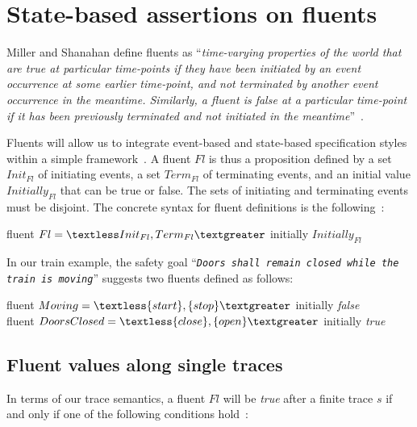 \section{State-based assertions on fluents\label{section:background-fluents}}

Miller and Shanahan define fluents as ``\emph{time-varying properties of the world that are true at particular time-points if they have been initiated by an event occurrence at some earlier time-point, and not terminated by another event occurrence in the meantime. Similarly, a fluent is false at a particular time-point if it has been previously terminated and not initiated in the meantime}''~\cite{Miller:2002}.

Fluents will allow us to integrate event-based and state-based specification styles within a simple framework~\cite{Giannakopoulou:2003}. A fluent $Fl$ is thus a proposition defined by a set $Init_{Fl}$ of initiating events, a set $Term_{Fl}$ of terminating events, and an initial value $Initially_{Fl}$ that can be true or false. The sets of initiating and terminating events must be disjoint. The concrete syntax for fluent definitions is the following~\cite{Giannakopoulou:2003}:

\begin{center}
fluent $Fl = \textless Init_{Fl}, Term_{Fl} \textgreater $ initially $Initially_{Fl}$
\end{center}

In our train example, the safety goal ``\emph{\texttt{Doors shall remain closed while the train is moving}}'' suggests two fluents defined as follows:

\begin{center}
fluent $Moving = \textless \{start\}, \{stop\} \textgreater $ initially \emph{false} \\
fluent $DoorsClosed = \textless \{close\}, \{open\} \textgreater $ initially \emph{true} \\
\end{center}

\subsection{Fluent values along single traces\label{subsection:background-fluents-single-traces}}

In terms of our trace semantics, a fluent $Fl$ will be \emph{true} after a finite trace $s$ if and only if one of the following conditions hold~\cite{Giannakopoulou:2003}:

